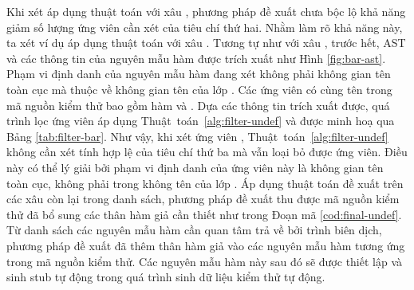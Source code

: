Khi xét áp dụng thuật toán với xâu , phương pháp đề xuất chưa bộc lộ khả năng giảm số lượng ứng viên cần xét của tiêu chí thứ hai. Nhằm làm rõ khả năng này, ta xét ví dụ áp dụng thuật toán với xâu . Tương tự như với xâu , trước hết, AST và các thông tin của nguyên mẫu hàm được trích xuất như Hình \autoref{fig:bar-ast}. Phạm vi định danh của nguyên mẫu hàm đang xét không phải không gian tên toàn cục mà thuộc về không gian tên của lớp . Các ứng viên có cùng tên  trong mã nguồn kiểm thử bao gồm hàm  và . Dựa các thông tin trích xuất được, quá trình lọc ứng viên áp dụng Thuật~toán~\autoref{alg:filter-undef} và được minh hoạ qua Bảng \autoref{tab:filter-bar}. Như vậy, khi xét ứng viên , Thuật~toán~\autoref{alg:filter-undef} không cần xét tính hợp lệ của tiêu chí thứ ba mà vẫn loại bỏ được ứng viên. Điều này có thể lý giải bởi phạm vi định danh của ứng viên này là không gian tên toàn cục, không phải trong không tên của lớp . Áp dụng thuật toán đề xuất trên các xâu còn lại trong danh sách, phương pháp đề xuất thu được mã nguồn kiểm thử đã bổ sung các thân hàm giả cần thiết như trong Đoạn mã \autoref{cod:final-undef}. Từ danh sách các nguyên mẫu hàm cần quan tâm trả về bởi trình biên dịch, phương pháp đề xuất đã thêm thân hàm giả  vào các nguyên mẫu hàm tương ứng trong mã nguồn kiểm thử. Các nguyên mẫu hàm này sau đó sẽ được thiết lập và sinh stub tự động trong quá trình sinh dữ liệu kiểm thử tự động.

